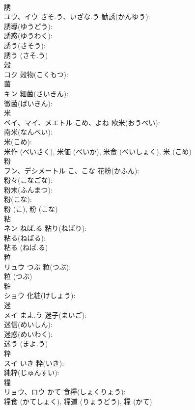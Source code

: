 \documentclass[8pt]{extreport}
\begin{document}
\begin{CJK}{UTF8}{min}
\\	誘			
\\	ユウ、イウ	さそ.う、いざな.う	勧誘(かんゆう): 
\\	誘導(ゆうどう): 
\\	誘惑(ゆうわく): 
\\	誘う(さそう): 
\\	誘う (さそ.う)
\\	穀			
\\	コク		穀物(こくもつ): 
\\	菌			
\\	キン		細菌(さいきん): 
\\	黴菌(ばいきん): 
\\	米			
\\	ベイ、マイ、メエトル	こめ、よね	欧米(おうべい): 
\\	南米(なんべい): 
\\	米(こめ): 
\\	米作 (べいさく), 米価 (べいか), 米食 (べいしょく), 米 (こめ)
\\	粉			
\\	フン、デシメートル	こ、こな	花粉(かふん): 
\\	粉々(こなごな): 
\\	粉末(ふんまつ): 
\\	粉(こな): 
\\	粉 (こ), 粉 (こな)
\\	粘			
\\	ネン	ねば.る	粘り(ねばり): 
\\	粘る(ねばる): 
\\	粘る (ねば.る)
\\	粒			
\\	リュウ	つぶ	粒(つぶ): 
\\	粒 (つぶ)
\\	粧			
\\	ショウ		化粧(けしょう): 
\\	迷			
\\	メイ	まよ.う	迷子(まいご): 
\\	迷信(めいしん): 
\\	迷惑(めいわく): 
\\	迷う (まよ.う)
\\	粋			
\\	スイ	いき	粋(いき): 
\\	純粋(じゅんすい): 
\\	糧			
\\	リョウ、ロウ	かて	食糧(しょくりょう): 
\\	糧食 (かてしょく), 糧道 (りょうどう), 糧 (かて)

\end{CJK}
\end{document}
